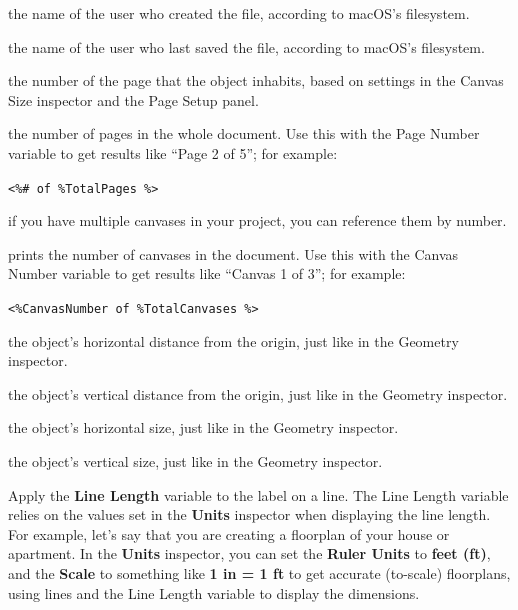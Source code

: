 \documentclass[../main.tex]{subfiles}
\begin{document}
\begin{description}[style=nextline]
    \begin{description}[style=nextline]
      \item[{Creator \texttt{<\%Creator\%>}}] the name of the user who created the file, according
        to macOS's filesystem.
      \item[{Modifier \texttt{<\%Modifier\%>}}] the name of the user who last saved the file,
        according to macOS's filesystem.
      \item[{Page Number \texttt{<\%\#\%>}}] the number of the page that the object inhabits,
        based on settings in the Canvas Size inspector and the Page Setup panel.
      \item[{Total Pages \texttt{<\%TotalPages\%>}}] the number of pages in the whole document.
        Use this with the Page Number variable to get results like ``Page 2 of 5''; for example:
      \item[{}] \texttt{<\%\# of \%TotalPages \%>}
      \item[{Canvas Number \texttt{<\%CanvasNumber\%>}}] if you have multiple canvases in your
        project, you can reference them by number.
      \item[{Total Canvases \texttt{<\%TotalCanvases\%>}}] prints the number of canvases in the
        document. Use this with the Canvas Number variable to get results like ``Canvas 1 of 3'';
        for example:
      \item[{}] \texttt{<\%CanvasNumber of \%TotalCanvases \%>}
      \item[{X Position \texttt{<\%X\%>}}] the object's horizontal distance from the origin, just
        like in the Geometry inspector.
      \item[{Y Position \texttt{<\%Y\%>}}] the object's vertical distance from the origin, just
        like in the Geometry inspector.
      \item[{Width \texttt{<\%Width\%>}}] the object's horizontal size, just like in the Geometry
        inspector.
      \item[{Height \texttt{<\%Height\%>}}] the object's vertical size, just like in the Geometry
        inspector.
      \item[{Line Length \texttt{<\%Length\%>}}] Apply the \textbf{Line Length} variable to the
        label on a line. The Line Length variable relies on the values set in the \textbf{Units}
        inspector when displaying the line length. For example, let's say that you are creating a
        floorplan of your house or apartment. In the \textbf{Units} inspector, you can set the
        \textbf{Ruler Units} to \textbf{feet (ft)}, and the \textbf{Scale} to something like
        \textbf{1 in = 1 ft} to get accurate (to-scale) floorplans, using lines and the Line
        Length variable to display the dimensions.


\end{description}
\end{description}
\end{document}

